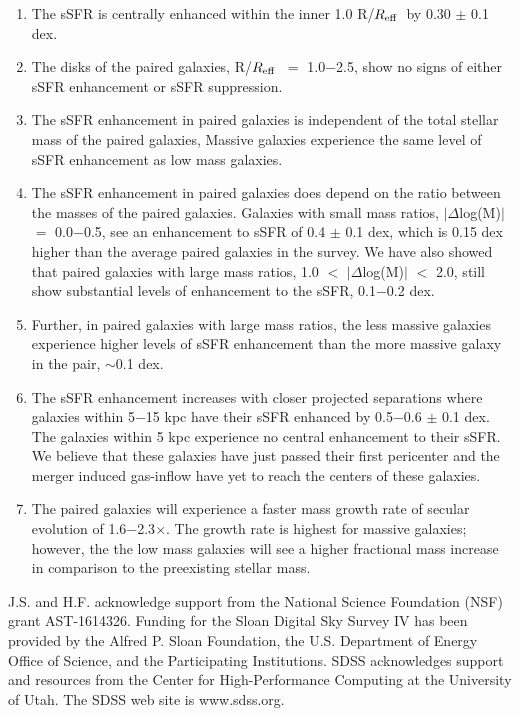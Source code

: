 \documentclass[iop,revtex4,twocolumn,apj,numberedappendix,appendixfloats]{emulateapj}
\newcommand{\reff}{$R_{\rm eff}$}
\begin{document}
\begin{enumerate}
\item The sSFR is centrally enhanced within the inner 1.0 R/\reff\ by 0.30 $\pm$ 0.1 dex. 
\item The disks of the paired galaxies, R/\reff\ $=$ 1.0$-$2.5, show no signs of either sSFR enhancement or sSFR suppression. 
\item The sSFR enhancement in paired galaxies is independent of the total stellar mass of the paired galaxies, Massive galaxies experience the same level of sSFR enhancement as low mass galaxies.
\item The sSFR enhancement in paired galaxies does depend on the ratio between the masses of the paired galaxies. Galaxies with small mass ratios, $|\Delta$log(M)$|$ $=$ 0.0$-$0.5, see an enhancement to sSFR of 0.4 $\pm$ 0.1 dex, which is 0.15 dex higher than the average paired galaxies in the survey. We have also showed that paired galaxies with large mass ratios, 1.0 $<$ $|\Delta$log(M)$|$ $<$ 2.0, still show substantial levels of enhancement to the sSFR, 0.1$-$0.2 dex. 
\item Further, in paired galaxies with large mass ratios, the less massive galaxies experience higher levels of sSFR enhancement than the more massive galaxy in the pair, $\sim$0.1 dex.
\item The sSFR enhancement increases with closer projected separations where galaxies within 5$-$15 kpc have their sSFR enhanced by 0.5$-$0.6 $\pm$ 0.1 dex. The galaxies within 5 kpc experience no central enhancement to their sSFR. We believe that these galaxies have just passed their first pericenter and the merger induced gas-inflow have yet to reach the centers of these galaxies.
\item The paired galaxies will experience a faster mass growth rate of secular evolution of 1.6$-$2.3$\times$. The growth rate is highest for massive galaxies; however, the the low mass galaxies will see a higher fractional mass increase in comparison to the preexisting stellar mass. 

\end{enumerate}

\acknowledgments

J.S. and H.F. acknowledge support from the National Science Foundation (NSF) grant AST-1614326. Funding for the Sloan Digital Sky Survey IV has been provided by the Alfred P. Sloan Foundation, the U.S. Department of Energy Office of Science, and the Participating Institutions. SDSS acknowledges support and resources from the Center for High-Performance Computing at the University of Utah. The SDSS web site is www.sdss.org.
\end{document}
